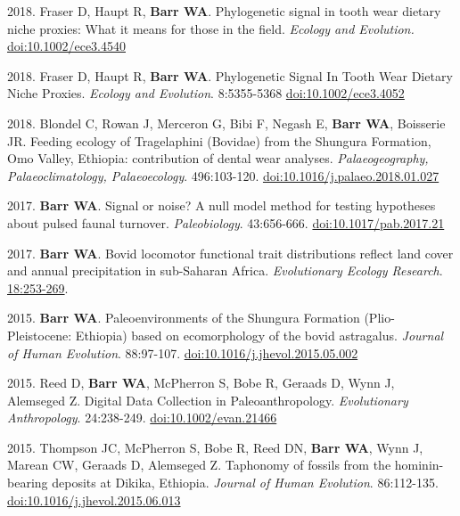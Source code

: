 \begin{etaremune}
\item 2018. Fraser D, Haupt R,  {\bfseries Barr WA}. Phylogenetic signal in tooth wear dietary niche proxies: What it means for those in the field. \emph{Ecology and Evolution.} \href{https://dx.doi.org/10.1002/ece3.4540}{doi:10.1002/ece3.4540}


\item  2018. Fraser D, Haupt R,  {\bfseries Barr WA}. Phylogenetic Signal In Tooth Wear Dietary Niche Proxies. \emph{Ecology and Evolution}. 8:5355-5368 \href{https://doi.org/10.1002/ece3.4052}{doi:10.1002/ece3.4052}

\item  2018. Blondel C, Rowan J, Merceron G, Bibi F,  Negash E, {\bfseries Barr WA}, Boisserie JR. Feeding ecology of Tragelaphini (Bovidae) from the Shungura Formation, Omo Valley, Ethiopia: contribution of dental wear analyses.  \emph{Palaeogeography, Palaeoclimatology, Palaeoecology}. 496:103-120. \href{https://doi.org/10.1016/j.palaeo.2018.01.027}{doi:10.1016/j.palaeo.2018.01.027}


\item  2017. {\bfseries Barr WA}. Signal or noise? A null model method for testing hypotheses about pulsed faunal turnover. \emph{Paleobiology}. 43:656-666. \href{https://doi.org/10.1017/pab.2017.21}{doi:10.1017/pab.2017.21}

\item  2017. {\bfseries Barr WA}. Bovid locomotor functional trait distributions reflect land cover and annual precipitation in sub-Saharan Africa. \emph{Evolutionary Ecology Research}.  \href{http://www.evolutionary-ecology.com/issues/v18/n03/ddar3051.pdf}{18:253-269}.


\item  2015. {\bfseries Barr WA}. Paleoenvironments of the Shungura Formation (Plio-Pleistocene: Ethiopia) based on ecomorphology of the bovid astragalus. \emph{Journal of Human Evolution}. 88:97-107. \href{http://dx.doi.org/10.1016/j.jhevol.2015.05.002}{doi:10.1016/j.jhevol.2015.05.002}

\item  2015. Reed D, {\bfseries Barr WA}, McPherron S, Bobe R, Geraads D, Wynn J, Alemseged Z. Digital Data Collection in Paleoanthropology. \emph{Evolutionary Anthropology}. 24:238-249. \href{http://dx.doi.org/10.1002/evan.21466}{doi:10.1002/evan.21466}

\item  2015. Thompson JC, McPherron S, Bobe R, Reed DN, {\bfseries Barr WA}, Wynn J, Marean CW, Geraads D, Alemseged Z. Taphonomy of fossils from the hominin-bearing deposits at Dikika, Ethiopia. \emph{Journal of Human Evolution}. 86:112-135. \href{http://dx.doi.org/10.1016/j.jhevol.2015.06.013}{doi:10.1016/j.jhevol.2015.06.013}




\end{etaremune}
